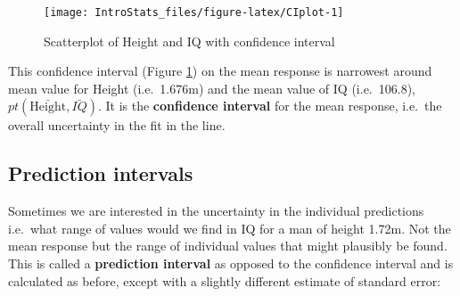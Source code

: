 \documentclass[
  oneside]{krantz}
\newenvironment{Shaded}{\begin{snugshade}}{\end{snugshade}}
\newcommand{\AttributeTok}[1]{\textcolor[rgb]{0.77,0.63,0.00}{#1}}
\newcommand{\CommentTok}[1]{\textcolor[rgb]{0.56,0.35,0.01}{\textit{#1}}}
\newcommand{\DecValTok}[1]{\textcolor[rgb]{0.00,0.00,0.81}{#1}}
\newcommand{\FloatTok}[1]{\textcolor[rgb]{0.00,0.00,0.81}{#1}}
\newcommand{\FunctionTok}[1]{\textcolor[rgb]{0.00,0.00,0.00}{#1}}
\newcommand{\NormalTok}[1]{#1}
\newcommand{\OtherTok}[1]{\textcolor[rgb]{0.56,0.35,0.01}{#1}}
\newcommand{\SpecialCharTok}[1]{\textcolor[rgb]{0.00,0.00,0.00}{#1}}
\newcommand{\StringTok}[1]{\textcolor[rgb]{0.31,0.60,0.02}{#1}}
\begin{document}
\begin{Shaded}
\end{Shaded}

\begin{figure}

{\centering \texttt{[image: IntroStats\_files/figure-latex/CIplot-1]} 

}

\caption{Scatterplot of Height and IQ with confidence interval}\label{fig:CIplot}
\end{figure}

This confidence interval (Figure \ref{fig:CIplot}) on the mean response is narrowest around mean value for Height (i.e.~1.676m) and the mean value of IQ (i.e.~106.8), \(pt(\bar{\mathrm{Height}},\bar{IQ})\). It is the \textbf{confidence interval} for the mean response, i.e.~the overall uncertainty in the fit in the line.

\hypertarget{prediction-intervals}{%
\subsection{Prediction intervals}\label{prediction-intervals}}

Sometimes we are interested in the uncertainty in the individual predictions i.e.~what range of values would we find in IQ for a man of height 1.72m. Not the mean response but the range of individual values that might plausibly be found. This is called a \textbf{prediction interval} as opposed to the confidence interval and is calculated as before, except with a slightly different estimate of standard error:
\end{document}
